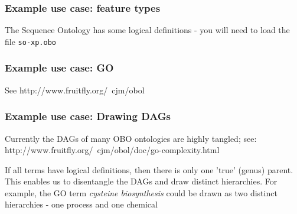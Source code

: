 \subsubsection{Example use case: feature types}

The Sequence Ontology has some logical definitions - you will need to
load the file {\tt so-xp.obo}

\subsubsection{Example use case: GO}

See
http://www.fruitfly.org/~cjm/obol

\subsubsection{Example use case: Drawing DAGs}

Currently the DAGs of many OBO ontologies are highly tangled; see:
http://www.fruitfly.org/~cjm/obol/doc/go-complexity.html

If all terms have logical definitions, then there is only one 'true'
(genus) \isa parent. This enables us to disentangle the DAGs and draw
distinct hierarchies. For example, the GO term {\em cysteine
biosynthesis} could be drawn as two distinct hierarchies - one process
and one chemical
